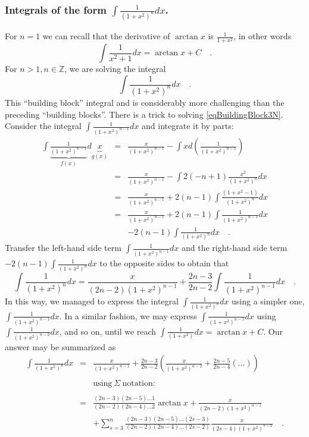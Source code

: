 \documentclass[12pt]{book}
\begin{document}
\subsubsection {Integrals of the form $\displaystyle\int \frac{1}{(1+x ^2)^n} dx $.}
For $n=1$ we can recall that the derivative of $\arctan x$ is $\displaystyle\frac{1}{1+x^2}$, in other words
\[
\int \frac{1}{x^2+1}dx= \arctan x+C\quad .
\]
For $n>1, n\in \mathbb Z$, we are solving the integral
\begin{equation}\label{eqBuildingBlock3N}
\int \frac{1}{(1+x ^2)^n}dx\quad .
\end{equation}
This ``building block'' integral and is considerably more challenging than the preceding ``building blocks''. There is a trick to solving \eqref{eqBuildingBlock3N}. Consider the integral $\displaystyle\int \frac{1}{(1+x ^2)^{n-1}}dx$ and integrate it by parts:
\[
\begin{array}{rcl}
\displaystyle \int \underbrace{\frac{1}{(1+x ^2)^{n-1}}}_{f(x)}d\underbrace{x}_{g(x)}&=&\displaystyle \frac{x}{(1+x ^2)^{n-1}}-\int x d\left(\frac{1}{(1+x ^2)^{n-1}}\right)\\
&=&\displaystyle\frac{x}{(1+x ^2)^{n-1}}- \int 2(-n+1)\frac{x^2}{(1+x^2)^n}dx\\
&=&\displaystyle\frac{x}{(1+x ^2)^{n-1}}+2(n-1) \int \frac{(1+x^2-1)}{(1+x^2)^n}dx\\
&=&\displaystyle\frac{x}{(1+x ^2)^{n-1}} +2(n-1)\int \frac{1}{(1+x^2)^{n-1}}dx \\&&\displaystyle -2(n-1) \int \frac{1}{(1+x^2)^n}dx\quad .
\end{array}
\]
Transfer the left-hand side term $\displaystyle\int \frac{1}{(1+x^2)^{n-1}}dx$ and the right-hand side term  $\displaystyle -2(n-1) \int \frac{1}{(1+x^2)^n}dx$ to the opposite sides to obtain that 
\[
\int \frac{1}{(1+x^2)^n}dx= \frac{x}{(2n-2)(1+x ^2)^{n-1}}+ \frac{2n-3}{2n-2}\int \frac{1}{(1+x^2)^{n-1}}dx\quad .
\]
In this way, we managed to express the integral $\displaystyle\int \frac{1}{(1+x^2)^n}dx$ using a simpler one, $\displaystyle\int \frac{1}{(1+x^2)^{n-1}}dx$. In a similar fashion, we may express $\displaystyle\int \frac{1}{(1+x^2)^{n-1}}dx$ using $\displaystyle\int \frac{1}{(1+x^2)^{n-2}}dx$, and so on, until we reach $\displaystyle\int \frac{1}{(1+x^2)}dx=\arctan x +C$. Our answer may be summarized as
\[
\begin{array}{rcl}
\displaystyle \int \frac{1}{(1+x^2)^n}dx&=& \displaystyle  \frac{x}{(1+x ^2)^{n-1}}+\frac{2n-3}{2n-2}\left(\frac{x}{(1+x^2)^{n-2}}+\frac{2n-5}{2n-4}\left(\dots\right)\right)\\ \\ &&\mathrm{using~}\Sigma \mathrm{~notation:}\\ \\
&=&\displaystyle \frac{(2n-3 )(2n-5)\dots 1}{(2n-2)(2n-4)\dots 2}\arctan x+  \frac{x}{(2n-2)(1+x ^2)^{n-1}} \\&&\displaystyle + \sum_{s=3}^{n} \frac{(2n-3 )(2n-5)\dots (2s-3)}{(2n-2)(2n-4)\dots (2s-2)} \frac{x}{(2s-4)(1+x^2)^{s-2}} \quad .
\end{array}
\]
\end{document}
